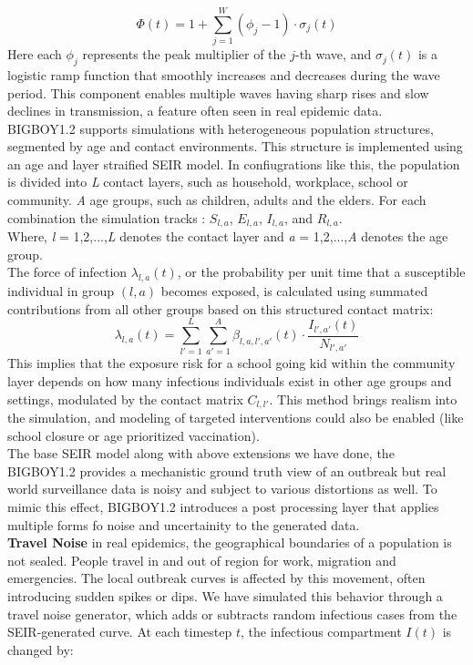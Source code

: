 \documentclass[11pt,a4paper]{article}
\theoremstyle{remark}\newtheorem{remark}{Remark}
\begin{document}
\begin{equation} \label{eq:phi_t}
\Phi(t) = 1 + \sum_{j=1}^{W} (\phi_j - 1) \cdot \sigma_j(t)
\end{equation}
Here each $\phi_j$ represents the peak multiplier of the $j$-th wave, and $\sigma_j(t)$ is a logistic ramp function that smoothly increases and decreases during the wave period. This component enables multiple waves having sharp rises and slow declines in transmission, a feature often seen in real epidemic data. \\
BIGBOY1.2 supports simulations with heterogeneous population structures, segmented by age and contact environments. This structure is implemented using an age and layer straified SEIR model. In confiugrations like this, the population is divided into\textit{ L }contact layers, such as household, workplace, school or community. \textit{A} age groups, such as children, adults and the elders. For each combination the simulation tracks : 
$S_{l,a}$, $E_{l,a}$, $I_{l,a}$, and $R_{l,a}$. \\
Where, \textit{l} = 1,2,...,\textit{L} denotes the contact layer and \textit{a} = 1,2,...,\textit{A} denotes the age group. \\
The force of infection $\lambda_{l,a}(t)$, or the probability per unit time that a susceptible individual in group $(l,a)$ becomes exposed, is calculated using summated contributions from all other groups based on this structured contact matrix:
\begin{equation} \label{eq:force_of_infection}
\lambda_{l,a}(t) = \sum_{l'=1}^{L} \sum_{a'=1}^{A} \beta_{l,a,l',a'}(t) \cdot \frac{I_{l',a'}(t)}{N_{l',a'}}
\end{equation}
This implies that the exposure risk for a school going kid within the community layer depends on how many infectious individuals exist in other age groups and settings, modulated by the contact matrix $C_{l,l'}$. This method brings realism into the simulation, and modeling of targeted interventions could also be enabled (like school closure or age prioritized vaccination). \\
The base SEIR model along with above extensions we have done, the BIGBOY1.2 provides a mechanistic ground truth view of an outbreak but real world surveillance data is noisy and subject to various distortions as well. To mimic this effect, BIGBOY1.2 introduces a post processing layer that applies multiple forms fo noise and uncertainity to the generated data. \\
\textbf{Travel Noise} in real epidemics, the geographical boundaries of a population is not sealed. People travel in and out of region for work, migration and emergencies. The local outbreak curves is affected by this movement, often introducing sudden spikes or dips. We have simulated this behavior through a travel noise generator, which adds or subtracts random infectious cases from the SEIR-generated curve. At each timestep $t$, the infectious compartment $I(t)$ is changed by:
\end{document}
